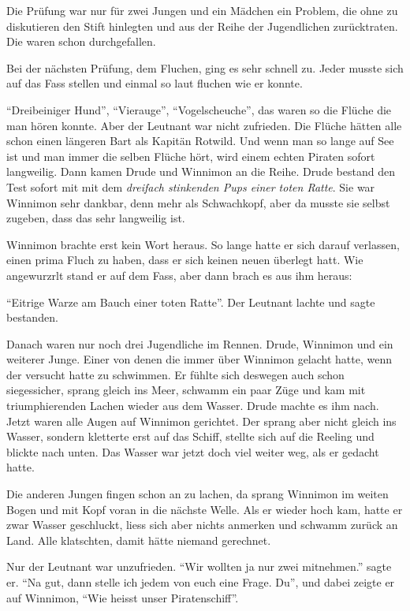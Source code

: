 Die Prüfung war nur für zwei Jungen und ein Mädchen ein Problem, die ohne zu diskutieren den Stift hinlegten und aus der Reihe der Jugendlichen zurücktraten. Die waren schon durchgefallen. 

Bei der nächsten Prüfung, dem Fluchen, ging es sehr schnell zu. Jeder musste sich auf das Fass stellen und einmal so laut fluchen wie er konnte. 

\enquote{Dreibeiniger Hund}, \enquote{Vierauge}, \enquote{Vogelscheuche}, das waren so die Flüche die man hören konnte. Aber der Leutnant war nicht zufrieden. Die Flüche hätten alle schon einen längeren Bart als Kapitän Rotwild. Und wenn man so lange auf See ist und man immer die selben Flüche hört, wird einem echten Piraten sofort langweilig. Dann kamen Drude und Winnimon an die Reihe. Drude bestand den Test sofort mit mit dem {\it dreifach stinkenden Pups einer toten Ratte}. Sie war Winnimon sehr dankbar, denn mehr als Schwachkopf, aber da musste sie selbst zugeben, dass das sehr langweilig ist.

Winnimon brachte erst kein Wort heraus. So lange hatte er sich darauf verlassen, einen prima Fluch zu haben, dass er sich keinen neuen überlegt hatt. Wie angewurzrlt stand er auf dem Fass, aber dann brach es aus ihm heraus:

\enquote{Eitrige Warze am Bauch einer toten Ratte}. Der Leutnant lachte und sagte bestanden.

Danach waren nur noch drei Jugendliche im Rennen. Drude, Winnimon und ein weiterer Junge. Einer von denen die immer über Winnimon gelacht hatte, wenn der versucht hatte zu schwimmen. Er fühlte sich deswegen auch schon siegessicher, sprang gleich ins Meer, schwamm ein paar Züge und kam mit triumphierenden Lachen wieder aus dem Wasser. Drude machte es ihm nach. Jetzt waren alle Augen auf Winnimon gerichtet. Der sprang aber nicht gleich ins Wasser, sondern kletterte erst auf das Schiff, stellte sich auf die Reeling und blickte nach unten. Das Wasser war jetzt doch viel weiter weg, als er gedacht hatte. 

Die anderen Jungen fingen schon an zu lachen, da sprang Winnimon im weiten Bogen und mit Kopf voran in die nächste Welle. Als er wieder hoch kam, hatte er zwar Wasser geschluckt, liess sich aber nichts anmerken und schwamm zurück an Land. Alle klatschten, damit hätte niemand gerechnet.

Nur der Leutnant war unzufrieden. \enquote{Wir wollten ja nur zwei mitnehmen.} sagte er. \enquote{Na gut, dann stelle ich jedem von euch eine Frage. Du}, und dabei zeigte er auf Winnimon, \enquote{Wie heisst unser Piratenschiff}.

